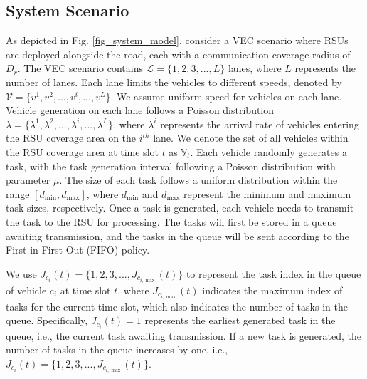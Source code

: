 \documentclass[lettersize,journal,onecolumn]{IEEEtran}
\begin{document}
\subsection{System Scenario}
As depicted in Fig. \ref{fig_system_model}, consider a VEC scenario where RSUs are deployed alongside the road, each with a communication coverage radius of ${{D}_{r}}$. The VEC scenario contains $\mathcal{L}=\{1,2,3,...,L\}$ lanes, where $L$ represents the number of lanes. Each lane limits the vehicles to different speeds, denoted by $\mathcal{V}=\{v^{1},v^{2},...,v^{i},...,v^{L}\}$. We assume uniform speed for vehicles on each lane. Vehicle generation on each lane follows a Poisson distribution $\mathcal{\lambda} =\{{{\lambda }^{1}},{{\lambda }^{2}},...,{{\lambda }^{i}},...,{{\lambda }^{L}}\}$, where ${{\lambda }^{i}}$ represents the arrival rate of vehicles entering the RSU coverage area on the $i^{th}$ lane. We denote the set of all vehicles within the RSU coverage area at time slot $t$ as ${{\mathbb{V}}_{t}}$. Each vehicle randomly generates a task, with the task generation interval following a Poisson distribution with parameter $\mu$. The size of each task follows a uniform distribution within the range $[{{d}_{\min }},{{d}_{\max }}]$, where ${{d}_{\min }}$ and ${{d}_{\max }}$ represent the minimum and maximum task sizes, respectively. Once a task is generated, each vehicle needs to transmit the task to the RSU for processing. The tasks will first be stored in a queue awaiting transmission, and the tasks in the queue will be sent according to the First-in-First-Out (FIFO) policy. 

We use ${{J}_{{{c}_{i}}}}(t)=\{1,2,3,...,{{J}_{{{c}_{i,\max}}}}(t)\}$ to represent the task index in the queue of vehicle ${{c}_{i}}$ at time slot $t$, where ${{J}_{{{c}_{i,\max}}}}(t)$ indicates the maximum index of tasks for the current time slot, which also indicates the number of tasks in the queue. Specifically, ${{J}_{{{c}_{i}}}}(t)=1$ represents the earliest generated task in the queue, i.e., the current task awaiting transmission.
If a new task is generated, the number of tasks in the queue increases by one, i.e., ${{J}_{{{c}_{i}}}}(t)=\{1,2,3,...,{{J}_{{{c}_{i,\max}}}}(t)\}$.
\end{document}
